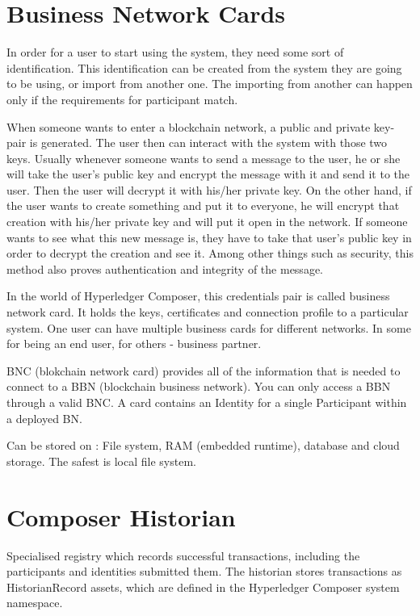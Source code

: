 \documentclass[a4paper,11pt]{report}
\begin{document}
\section{Business Network Cards}

In order for a user to start using the system, they need some sort of identification. This identification can be created from the system they are going to be using, or import from another one. The importing from another can happen only if the requirements for participant match.	

When someone wants to enter a blockchain network, a public and private key-pair is  generated. The user then can interact with the system with those two keys. Usually whenever someone wants to send a message to the user, he or she will take the user’s public key and encrypt the message with it and send it to the user. Then the user will decrypt it with his/her private key. On the other hand, if the user wants to create something and put it to everyone, he will encrypt that creation with his/her private key and will put it open in the network. If someone wants to see what this new message is, they have to take that user’s public key in order to decrypt the creation and see it. Among other things such as security, this method also proves authentication and integrity of the message. 

In the world of Hyperledger Composer, this credentials pair is called business network card. It holds the keys, certificates and connection profile to a particular system. One user can have multiple business cards for different networks. In some for being an end user, for others - business partner. 

BNC (blokchain network card) provides all of the information that is needed to connect to a BBN (blockchain business network). You can only access a BBN through a valid BNC. A card contains an Identity for a single Participant within a deployed BN.

Can be stored on : File system, RAM (embedded runtime), database and cloud storage. The safest is local file system.



\section{Composer Historian}

Specialised registry which records successful transactions, including the participants and identities submitted them. The historian stores transactions as HistorianRecord assets, which are defined in the Hyperledger Composer system namespace.
\end{document}
